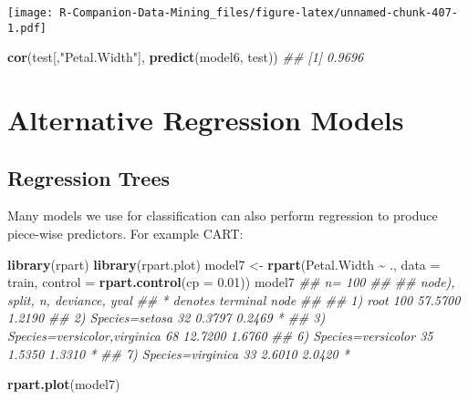 \documentclass[
  notitlepage]{book}
\newenvironment{Shaded}{\begin{snugshade}}{\end{snugshade}}
\newcommand{\CommentTok}[1]{\textcolor[rgb]{0.56,0.35,0.01}{\textit{#1}}}
\newcommand{\DataTypeTok}[1]{\textcolor[rgb]{0.13,0.29,0.53}{#1}}
\newcommand{\FloatTok}[1]{\textcolor[rgb]{0.00,0.00,0.81}{#1}}
\newcommand{\KeywordTok}[1]{\textcolor[rgb]{0.13,0.29,0.53}{\textbf{#1}}}
\newcommand{\NormalTok}[1]{#1}
\newcommand{\OperatorTok}[1]{\textcolor[rgb]{0.81,0.36,0.00}{\textbf{#1}}}
\newcommand{\StringTok}[1]{\textcolor[rgb]{0.31,0.60,0.02}{#1}}
\begin{document}
\texttt{[image: R-Companion-Data-Mining\_files/figure-latex/unnamed-chunk-407-1.pdf]}

\begin{Shaded}
\begin{Highlighting}[]
\KeywordTok{cor}\NormalTok{(test[,}\StringTok{"Petal.Width"}\NormalTok{], }\KeywordTok{predict}\NormalTok{(model6, test))}
\CommentTok{\#\# [1] 0.9696}
\end{Highlighting}
\end{Shaded}

\hypertarget{alternative-regression-models}{%
\section{Alternative Regression Models}\label{alternative-regression-models}}

\hypertarget{regression-trees}{%
\subsection{Regression Trees}\label{regression-trees}}

Many models we use for classification can also perform regression
to produce piece-wise predictors.
For example CART:

\begin{Shaded}
\begin{Highlighting}[]
\KeywordTok{library}\NormalTok{(rpart)}
\KeywordTok{library}\NormalTok{(rpart.plot)}
\NormalTok{model7 \textless{}{-}}\StringTok{ }\KeywordTok{rpart}\NormalTok{(Petal.Width }\OperatorTok{\textasciitilde{}}\StringTok{ }\NormalTok{., }\DataTypeTok{data =}\NormalTok{ train,}
  \DataTypeTok{control =} \KeywordTok{rpart.control}\NormalTok{(}\DataTypeTok{cp =} \FloatTok{0.01}\NormalTok{))}
\NormalTok{model7}
\CommentTok{\#\# n= 100 }
\CommentTok{\#\# }
\CommentTok{\#\# node), split, n, deviance, yval}
\CommentTok{\#\#       * denotes terminal node}
\CommentTok{\#\# }
\CommentTok{\#\# 1) root 100 57.5700 1.2190  }
\CommentTok{\#\#   2) Species=setosa 32  0.3797 0.2469 *}
\CommentTok{\#\#   3) Species=versicolor,virginica 68 12.7200 1.6760  }
\CommentTok{\#\#     6) Species=versicolor 35  1.5350 1.3310 *}
\CommentTok{\#\#     7) Species=virginica 33  2.6010 2.0420 *}
\end{Highlighting}
\end{Shaded}

\begin{Shaded}
\begin{Highlighting}[]
\KeywordTok{rpart.plot}\NormalTok{(model7)}
\end{Highlighting}
\end{Shaded}
\end{document}
